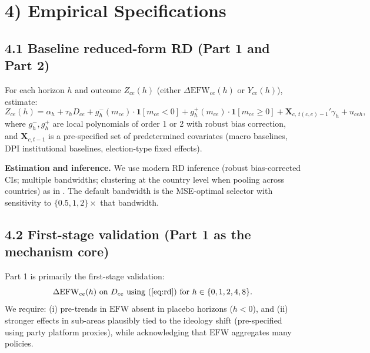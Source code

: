\documentclass[11pt]{article}
\newcommand{\EFW}{\mathrm{EFW}}
\newcommand{\bX}{\mathbf{X}}
\newcommand{\1}{\mathbf{1}}
\newcommand{\cid}{c}
\newcommand{\eid}{e}
\begin{document}
\section*{4) Empirical Specifications}

\subsection*{4.1 Baseline reduced-form RD (Part 1 and Part 2)}
For each horizon $h$ and outcome $Z_{\cid \eid}(h)$ (either $\Delta \EFW_{\cid \eid}(h)$ or $Y_{\cid \eid}(h)$), estimate:
\begin{equation}
Z_{\cid \eid}(h) = \alpha_h + \tau_h D_{\cid \eid} + g_{h}^{-}(m_{\cid \eid})\cdot \1[m_{\cid \eid}<0] + g_{h}^{+}(m_{\cid \eid})\cdot \1[m_{\cid \eid}\ge 0] + \bX_{\cid,\, t(\cid,\eid)-1}'\gamma_h + u_{\cid \eid h},
\label{eq:rd}
\end{equation}
where $g_h^{-},g_h^{+}$ are local polynomials of order 1 or 2 with robust bias correction, and $\bX_{\cid,t-1}$ is a pre-specified set of predetermined covariates (macro baselines, DPI institutional baselines, election-type fixed effects).

\textbf{Estimation and inference.} We use modern RD inference (robust bias-corrected CIs; multiple bandwidths; clustering at the country level when pooling across countries) as in \citet{CalonicoEtal2014,CalonicoEtal2019}. The default bandwidth is the MSE-optimal selector with sensitivity to $\{0.5,1,2\}\times$ that bandwidth.

\subsection*{4.2 First-stage validation (Part 1 as the mechanism core)}
Part 1 is primarily the first-stage validation:
\[
\Delta \EFW_{\cid \eid}(h) \text{ on } D_{\cid \eid} \text{ using (\ref{eq:rd}) for } h\in\{0,1,2,4,8\}.
\]
We require: (i) pre-trends in $\EFW$ absent in placebo horizons ($h<0$), and (ii) stronger effects in sub-areas plausibly tied to the ideology shift (pre-specified using party platform proxies), while acknowledging that $\EFW$ aggregates many policies.
\end{document}
